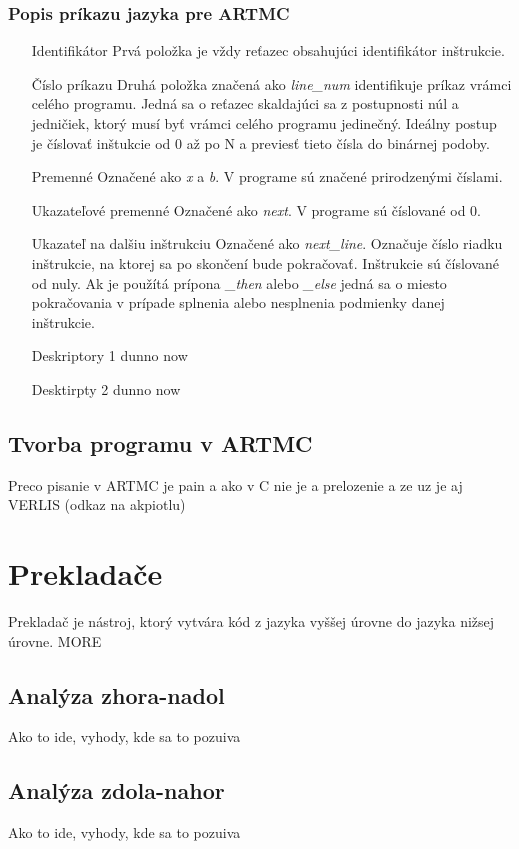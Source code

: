  \subsection{Popis príkazu jazyka pre ARTMC}
 \begin{itemize}
     \item[Identifikátor] Prvá položka je vždy reťazec obsahujúci identifikátor inštrukcie.
     \item[Číslo príkazu] Druhá položka značená ako \textit{line\_num} identifikuje príkaz
         vrámci celého programu. Jedná sa o reťazec skaldajúci sa z postupnosti
         núl a jedničiek, ktorý musí byť vrámci celého  programu jedinečný.
         Ideálny postup je číslovať inštukcie od 0 až po N a previesť tieto
         čísla do binárnej podoby.
     \item[Premenné] Označené ako \textit{x} a \textit{b}. V programe sú značené prirodzenými číslami.
     \item[Ukazateľové premenné] Označené ako \textit{next}. V programe sú číslované od 0.
     \item[Ukazateľ na dalšiu inštrukciu] Označené ako \textit{next\_line}. Označuje
         číslo riadku inštrukcie, na ktorej sa po skončení bude pokračovať. Inštrukcie
         sú číslované od nuly. Ak je použítá prípona \textit{\_then} alebo \textit{\_else}
         jedná sa o miesto pokračovania v prípade splnenia alebo nesplnenia podmienky danej inštrukcie.
     \item[Deskriptory 1] dunno now
     \item[Desktirpty 2] dunno now
 \end{itemize}
\section{Tvorba programu v ARTMC}
Preco pisanie v ARTMC je pain a ako v C nie je a prelozenie a ze uz je aj VERLIS (odkaz na akpiotlu)

\chapter{Prekladače}
Prekladač je nástroj, ktorý vytvára kód z jazyka vyššej úrovne do jazyka nižsej úrovne.
MORE
\section{Analýza zhora-nadol}
Ako to ide, vyhody, kde sa to pozuiva
\section{Analýza zdola-nahor}
Ako to ide, vyhody, kde sa to pozuiva
